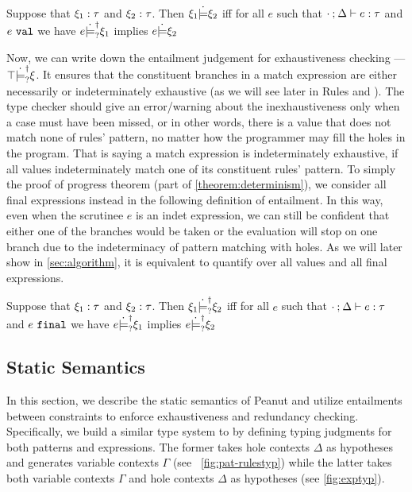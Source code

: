 \begin{definition}
  \label{definition:const-entailment}
  Suppose that $\xi_1 : \tau$ and $\xi_2 : \tau$.
  Then $\xi_1 \dot{\models} \xi_2$ iff for all $e$ such that $\cdot \mathbin{;} \Delta \vdash e : \tau$ and $e ~\mathtt{val}$ we have $e \dot{\models}_{?}^{\dag} \xi_1$ implies $e \dot{\models} \xi_2$
\end{definition}

Now, we can write down the entailment judgement for exhaustiveness checking --- $\top \dot{\models}_{?}^{\dag} \xi$. It ensures that the constituent branches in a match expression are either necessarily or indeterminately exhaustive (as we will see later in Rules \TMatchZPre and \TMatchNZPre). 
The type checker should give an error/warning about the inexhaustiveness only when a case must have been missed, or in other words, there is a value that does not match none of rules' pattern, no matter how the programmer may fill the holes in the program. That is saying a match expression is indeterminately exhaustive, if all values indeterminately match one of its constituent rules' pattern.
To simply the proof of progress theorem (part of \autoref{theorem:determinism}), we consider all final expressions instead in the following definition of entailment. 
In this way, even when the scrutinee $e$ is an indet expression, we can still be confident that either one of the branches would be taken or the evaluation will stop on one branch due to the indeterminacy of pattern matching with holes. As we will later show in \autoref{sec:algorithm}, it is equivalent to quantify over all values and all final expressions.

\begin{definition}
  \label{definition:nn-entailment}
  Suppose that $\xi_1 : \tau$ and $\xi_2 : \tau$. Then $\xi_1 \dot{\models}_{?}^{\dag} \xi_2$ iff for all $e$ such that $\cdot \mathbin{;} \Delta \vdash e : \tau$ and $e ~\mathtt{final}$ we have $e \dot{\models}_{?}^{\dag} \xi_1$ implies $e \dot{\models}_{?}^{\dag} \xi_2$ 
\end{definition}



\subsection{Static Semantics}\label{sec:statics}



In this section, we describe the static semantics of Peanut and utilize entailments between constraints to enforce exhaustiveness and redundancy checking.
  Specifically, we build a similar type system to
\cite{DBLP:journals/pacmpl/OmarVCH19} by defining typing judgments for both
patterns and expressions. The former takes hole contexts $\Delta$ as hypotheses and generates variable contexts $\Gamma$ (see \figurename~\ref{fig:pat-rulestyp}) while the latter 
takes both variable contexts $\Gamma$ and hole contexts $\Delta$ as hypotheses (see
\autoref{fig:exptyp}).

